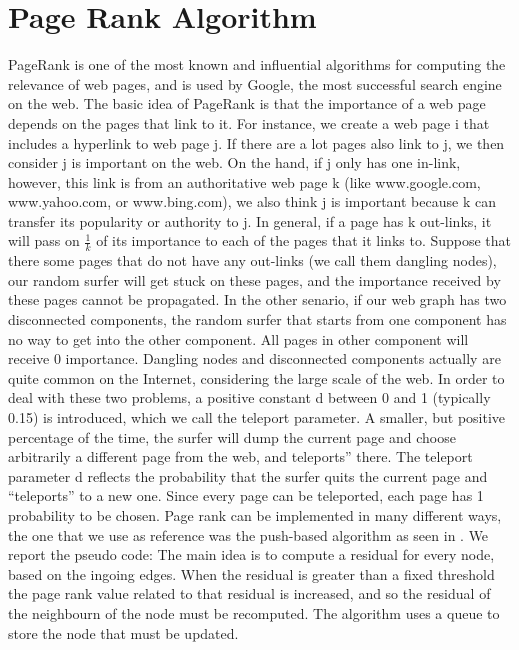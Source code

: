 \documentclass[journal]{IEEEtran}
\begin{document}
\section{Page Rank Algorithm}
PageRank is one of the most known and influential algorithms for computing the
relevance of web pages, and is used by Google, the most successful search
engine on the web. The basic idea of PageRank is that the importance of a web
page depends on the pages that link to it. For instance, we create a web page i
that includes a hyperlink to web page j. If there are a lot pages also link to
j, we then consider j is important on the web. On the hand, if j only has one
in-link, however, this link is from an authoritative web page k (like
www.google.com, www.yahoo.com, or www.bing.com), we also think j is important
because k can transfer its popularity or authority to j.
In general, if a page has k out-links, it will pass on ${\frac{1}{k}}$ of its
importance to each of the pages that it links to.
Suppose that there some pages that do not have any
out-links (we call them dangling nodes), our random surfer will get stuck on
these pages, and the importance received by these pages cannot be propagated.
In the other senario, if our web graph has two disconnected components, the
random surfer that starts from one component has no way to get into the other
component. All pages in other component will receive 0
importance.  Dangling nodes and disconnected components actually are quite
common on the Internet, considering the large scale of the web. In order to
deal with these two problems, a positive constant d between 0 and 1 (typically
0.15) is introduced, which we call the teleport parameter.
A smaller, but positive percentage of the time, the surfer will dump the
current page and choose arbitrarily a different page from the web, and 
teleports” there. The teleport parameter d reflects the probability that the
surfer quits the current page and “teleports” to a new one. Since every page
can be teleported, each page has 1 probability to be chosen.
Page rank can be implemented in many different ways, the one that we use as
reference was the push-based algorithm as seen in \cite{PR}.
We report the pseudo code:
The main idea is to compute a residual for every node, based on the ingoing
edges. When the residual is greater than a fixed threshold the
page rank value related to that residual is increased, and so the residual of
the neighbourn of the node must be recomputed. The algorithm uses a queue to
store the node that must be updated.
\end{document}
